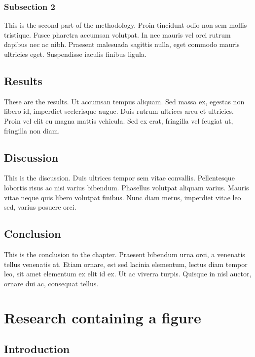 \documentclass[11pt,letterpaper,]{article}
\begin{document}
\subsubsection{Subsection 2}\label{subsection-2}

This is the second part of the methodology. Proin tincidunt odio non sem
mollis tristique. Fusce pharetra accumsan volutpat. In nec mauris vel
orci rutrum dapibus nec ac nibh. Praesent malesuada sagittis nulla, eget
commodo mauris ultricies eget. Suspendisse iaculis finibus ligula.

\subsection{Results}\label{results}

These are the results. Ut accumsan tempus aliquam. Sed massa ex, egestas
non libero id, imperdiet scelerisque augue. Duis rutrum ultrices arcu et
ultricies. Proin vel elit eu magna mattis vehicula. Sed ex erat,
fringilla vel feugiat ut, fringilla non diam.

\subsection{Discussion}\label{discussion}

This is the discussion. Duis ultrices tempor sem vitae convallis.
Pellentesque lobortis risus ac nisi varius bibendum. Phasellus volutpat
aliquam varius. Mauris vitae neque quis libero volutpat finibus. Nunc
diam metus, imperdiet vitae leo sed, varius posuere orci.

\subsection{Conclusion}\label{conclusion-1}

This is the conclusion to the chapter. Praesent bibendum urna orci, a
venenatis tellus venenatis at. Etiam ornare, est sed lacinia elementum,
lectus diam tempor leo, sit amet elementum ex elit id ex. Ut ac viverra
turpis. Quisque in nisl auctor, ornare dui ac, consequat tellus.

\section{Research containing a
figure}\label{research-containing-a-figure}

\subsection{Introduction}\label{introduction-2}
\end{document}
